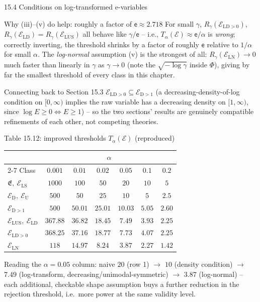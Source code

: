 \documentclass[aspectratio=169,10pt]{beamer}
\newcommand{\calE}{\mathcal{E}}
\newcommand{\frakE}{\mathfrak{E}}
\newcommand{\ED}{\mathcal{E}_{\mathrm{D}}}
\newcommand{\EDone}{\mathcal{E}_{\mathrm{D}>1}}
\newcommand{\EU}{\mathcal{E}_{\mathrm{U}}}
\newcommand{\ELS}{\mathcal{E}_{\mathrm{LS}}}
\newcommand{\ELDzero}{\mathcal{E}_{\mathrm{LD}>0}}
\newcommand{\ELD}{\mathcal{E}_{\mathrm{LD}}}
\newcommand{\ELUS}{\mathcal{E}_{\mathrm{LUS}}}
\newcommand{\ELN}{\mathcal{E}_{\mathrm{LN}}}
\begin{document}
\begin{frame}[allowframebreaks]{15.4 Conditions on log-transformed e-variables}
  \begin{block}{Why (iii)--(v) do help: roughly a factor of $\mathsf{e}\approx2.718$}
    For small $\gamma$, $R_\gamma(\ELDzero)$, $R_\gamma(\ELD)=R_\gamma(\ELUS)$ all behave like $\gamma/\mathsf{e}$ -- i.e., $T_\alpha(\calE)\approx \mathsf{e}/\alpha$ is \emph{wrong}; correctly inverting, the threshold shrinks by a factor of roughly $\mathsf{e}$ relative to $1/\alpha$ for small $\alpha$. The \emph{log-normal} assumption (v) is the strongest of all: $R_\gamma(\ELN)\to0$ much faster than linearly in $\gamma$ as $\gamma\to0$ (note the $\sqrt{-\log\gamma}$ inside $\Phi$), giving by far the smallest threshold of every class in this chapter.
  \end{block}

  \begin{block}{Connecting back to Section 15.3}
    $\ELDzero\subseteq\EDone$ (a decreasing-density-of-log condition on $[0,\infty)$ implies the raw variable has a decreasing density on $[1,\infty)$, since $\log E\ge0 \iff E\ge1$) -- so the two sections' results are genuinely compatible refinements of each other, not competing theories.
  \end{block}
\end{frame}

\begin{frame}{Table 15.12: improved thresholds $T_\alpha(\calE)$ (reproduced)}
  \centering
  \small
  \begin{tabular}{lcccccc}
    \toprule
     & \multicolumn{6}{c}{$\alpha$} \\
    \cmidrule(lr){2-7}
    Class & $0.001$ & $0.01$ & $0.02$ & $0.05$ & $0.1$ & $0.2$ \\
    \midrule
    $\frakE,\ \ELS$        & $1000$   & $100$   & $50$    & $20$   & $10$  & $5$ \\
    $\ED,\ \EU$            & $500$    & $50$    & $25$    & $10$   & $5$   & $2.5$ \\
    $\EDone$               & $500$    & $50.01$ & $25.01$ & $10.03$& $5.05$& $2.60$ \\
    $\ELUS,\ \ELD$         & $367.88$ & $36.82$ & $18.45$ & $7.49$ & $3.93$& $2.25$ \\
    $\ELDzero$             & $368.25$ & $37.16$ & $18.77$ & $7.73$ & $4.07$& $2.25$ \\
    $\ELN$                 & $118$    & $14.97$ & $8.24$  & $3.87$ & $2.27$& $1.42$ \\
    \bottomrule
  \end{tabular}
  \vspace{1em}

  \small Reading the $\alpha=0.05$ column: naive $20$ (row 1) $\to$ $10$ (density condition) $\to$ $7.49$ (log-transform, decreasing/unimodal-symmetric) $\to$ $3.87$ (log-normal) -- each additional, checkable shape assumption buys a further reduction in the rejection threshold, i.e.\ more power at the same validity level.
\end{frame}
\end{document}
